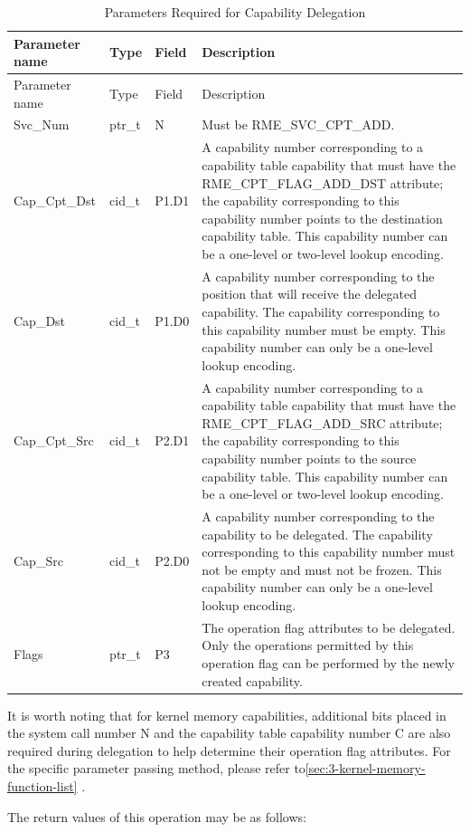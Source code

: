 \begin{xltabular}{\textwidth}{@{}>{\hsize\raggedright\arraybackslash}X>{\hsize\raggedright\arraybackslash}X>{\hsize\raggedright\arraybackslash}X>{\hsize\raggedright\arraybackslash}X@{}}
\caption{Parameters Required for Capability Delegation}\label{tab:2-9-capability-transfer-parameters}\\
\toprule
Parameter name & Type & Field & Description\tabularnewline
\endfirsthead
\toprule
Parameter name & Type & Field & Description\tabularnewline
\midrule
\endhead
\bottomrule
\endlastfoot
Svc\_Num & ptr\_t & N & Must be RME\_SVC\_CPT\_ADD.\tabularnewline
Cap\_Cpt\_Dst & cid\_t & P1.D1 &
A capability number corresponding to a capability table capability that must have the RME\_CPT\_FLAG\_ADD\_DST attribute; the capability corresponding to this capability number points to the destination capability table. This capability number can be a one-level or two-level lookup encoding.\tabularnewline
Cap\_Dst & cid\_t & P1.D0 &
A capability number corresponding to the position that will receive the delegated capability. The capability corresponding to this capability number must be empty. This capability number can only be a one-level lookup encoding.\tabularnewline
Cap\_Cpt\_Src & cid\_t & P2.D1 &
A capability number corresponding to a capability table capability that must have the RME\_CPT\_FLAG\_ADD\_SRC attribute; the capability corresponding to this capability number points to the source capability table. This capability number can be a one-level or two-level lookup encoding.\tabularnewline
Cap\_Src & cid\_t & P2.D0 &
A capability number corresponding to the capability to be delegated. The capability corresponding to this capability number must not be empty and must not be frozen. This capability number can only be a one-level lookup encoding.\tabularnewline
Flags & ptr\_t & P3 &
The operation flag attributes to be delegated. Only the operations permitted by this operation flag can be performed by the newly created capability.\tabularnewline
\end{xltabular}
\nopagebreak[4]

It is worth noting that for kernel memory capabilities, additional bits placed in the system call number N and the capability table capability number C are also required during delegation to help determine their operation flag attributes. For the specific parameter passing method, please refer to\ref{sec:3-kernel-memory-function-list}
.

The return values of this operation may be as follows:

